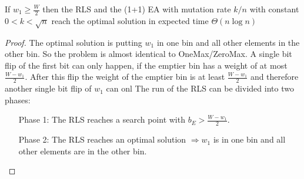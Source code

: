 \begin{theorem}\label{theo:OneMaxResult}
    If $w_1 \ge \frac W 2$  then the RLS and the (1+1) EA with mutation rate $k/n$ with constant $0<k<\sqrt{n}$ reach the optimal solution in expected time $\Theta(n\log{}n)$
\end{theorem}
\begin{proof}
    The optimal solution is putting $w_1$ in one bin and all other elements in the other bin.
    So the problem is almost identical to OneMax/ZeroMax.
    A single bit flip of the first bit can only happen, if the emptier bin has a weight of at most $\frac {W-w_1}{2}$.
    After this flip the weight of the emptier bin is at least $\frac {W-w_1}{2}$ and therefore another single bit flip of $w_1$ can onl
    The run of the RLS can be divided into two phases:
    \begin{itemize}
        \item[Phase 1:] The RLS reaches a search point with $b_E > \frac {W-w_1}{2}$.
        \item[Phase 2:] The RLS reaches an optimal solution $\Rightarrow w_1$ is in one bin and all other elements are in the other bin.
    \end{itemize}


\end{proof}
